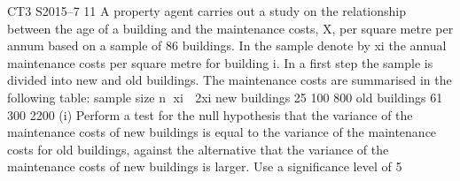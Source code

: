 \documentclass[a4paper,12pt]{article}
\begin{document}
\begin{enumerate}

CT3 S2015–7
11 A property agent carries out a study on the relationship between the age of a building and the maintenance costs, X, per square metre per annum based on a sample of 86 buildings. In the sample denote by xi the annual maintenance costs per square metre
for building i. In a first step the sample is divided into new and old buildings. The
maintenance costs are summarised in the following table:
  sample size n xi  2xi
new buildings 25 100 800
old buildings 61 300 2200
(i) Perform a test for the null hypothesis that the variance of the maintenance costs of new buildings is equal to the variance of the maintenance costs for old buildings, against the alternative that the variance of the maintenance costs of new buildings is larger. Use a significance level of 5%


\end{enumerate}
\end{document}
